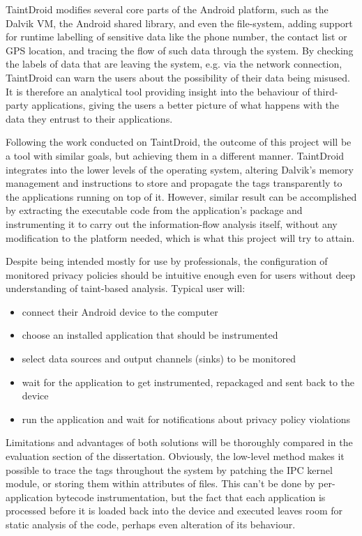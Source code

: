 \documentclass[12pt]{article}
\begin{document}
TaintDroid modifies several core parts of the Android platform, such as 
the Dalvik VM, the Android shared library, and even the file-system, 
adding support for runtime labelling of sensitive data like the phone number, 
the contact list or GPS location, and tracing the flow of such data through 
the system. By checking the labels of data that are leaving the system, e.g. 
via the network connection, TaintDroid can warn the users about the 
possibility of their data being misused. It is therefore an analytical tool 
providing insight into the behaviour of third-party applications, giving the 
users a better picture of what happens with the data they entrust to their 
applications.

Following the work conducted on TaintDroid, the outcome of this project 
will be a tool with similar goals, but achieving them in a different 
manner. TaintDroid integrates into the lower levels of the operating 
system, altering Dalvik's memory management and instructions to store and
propagate the tags transparently to the applications running on top of 
it. However, similar result can be accomplished by extracting the 
executable code from the application's package and instrumenting it to 
carry out the information-flow analysis itself, without any modification 
to the platform needed, which is what this project will try to attain.

Despite being intended mostly for use by professionals, the configuration 
of monitored privacy policies should be intuitive enough even for users 
without deep understanding of taint-based analysis. Typical user will:
\begin{itemize}
\item{connect their Android device to the computer}
\item{choose an installed application that should be instrumented}
\item{select data sources and output channels (sinks) to be monitored}
\item{wait for the application to get instrumented, repackaged and sent
      back to the device}
\item{run the application and wait for notifications about privacy policy
      violations}
\end{itemize}

Limitations and advantages of both solutions will be thoroughly 
compared in the evaluation section of the dissertation. Obviously, 
the low-level method makes it possible to trace the tags throughout 
the system by patching the IPC kernel module, or storing them within 
attributes of files. This can't be done by per-application bytecode 
instrumentation, but the fact that each application is processed before 
it is loaded back into the device and executed leaves room for static 
analysis of the code, perhaps even alteration of its behaviour. 
\end{document}
